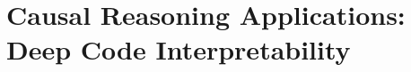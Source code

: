\documentclass[cpp,11pt]{wmthesis}
\begin{document}
\part{Causal Reasoning Applications: \hfill \break Deep Code Interpretability}





%











\appendix

%
%



%
%
\end{document}

